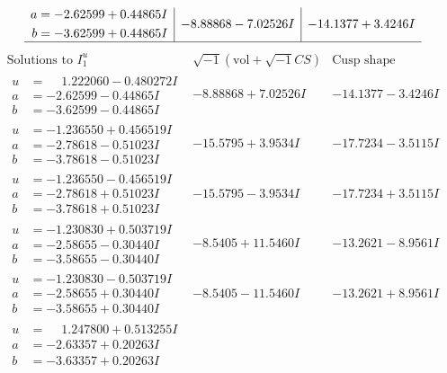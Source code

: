 \documentclass[1p]{elsarticle_modified}
\theoremstyle{definition}
\newcommand{\I}{\sqrt{-1}}
\begin{document}
$$\begin{array}{c|c|c}
\begin{aligned}
a &= -2.62599 + 0.44865 I \\
b &= -3.62599 + 0.44865 I\end{aligned}
 & -8.88868 - 7.02526 I & -14.1377 + 3.4246 I\\
 \hline 
 \end{array}$$\newpage$$\begin{array}{c|c|c}  
\text{Solutions to }I^u_{1}& \I (\text{vol} + \sqrt{-1}CS) & \text{Cusp shape}\\
 \hline 
\begin{aligned}
u &= \phantom{-}1.222060 - 0.480272 I \\
a &= -2.62599 - 0.44865 I \\
b &= -3.62599 - 0.44865 I\end{aligned}
 & -8.88868 + 7.02526 I & -14.1377 - 3.4246 I \\ \hline\begin{aligned}
u &= -1.236550 + 0.456519 I \\
a &= -2.78618 - 0.51023 I \\
b &= -3.78618 - 0.51023 I\end{aligned}
 & -15.5795 + 3.9534 I & -17.7234 - 3.5115 I \\ \hline\begin{aligned}
u &= -1.236550 - 0.456519 I \\
a &= -2.78618 + 0.51023 I \\
b &= -3.78618 + 0.51023 I\end{aligned}
 & -15.5795 - 3.9534 I & -17.7234 + 3.5115 I \\ \hline\begin{aligned}
u &= -1.230830 + 0.503719 I \\
a &= -2.58655 - 0.30440 I \\
b &= -3.58655 - 0.30440 I\end{aligned}
 & -8.5405 + 11.5460 I & -13.2621 - 8.9561 I \\ \hline\begin{aligned}
u &= -1.230830 - 0.503719 I \\
a &= -2.58655 + 0.30440 I \\
b &= -3.58655 + 0.30440 I\end{aligned}
 & -8.5405 - 11.5460 I & -13.2621 + 8.9561 I \\ \hline\begin{aligned}
u &= \phantom{-}1.247800 + 0.513255 I \\
a &= -2.63357 + 0.20263 I \\
b &= -3.63357 + 0.20263 I\end{aligned}

\end{array}$$
\end{document}
